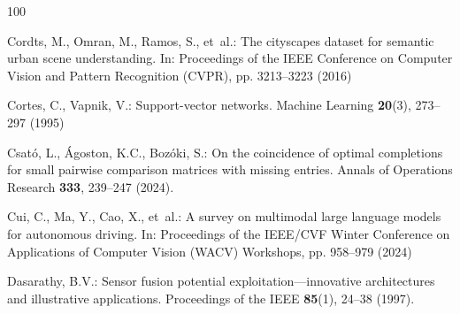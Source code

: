 \documentclass[graybox,envcountchap]{style/SNmono}
\begin{document}
\begin{thebibliography}{100}
{\color{red} 
Cordts, M., Omran, M., Ramos, S., et~al.: The cityscapes dataset for semantic
  urban scene understanding.
\newblock In: Proceedings of the IEEE Conference on Computer Vision and Pattern
  Recognition (CVPR), pp. 3213--3223 (2016)

\par}
{\color{red} 
Cortes, C., Vapnik, V.: Support-vector networks.
\newblock Machine Learning \textbf{20}(3), 273--297 (1995)

\par}

Csat{\'o}, L., {\'A}goston, K.C., Boz{\'o}ki, S.: On the coincidence of optimal
  completions for small pairwise comparison matrices with missing entries.
\newblock Annals of Operations Research \textbf{333}, 239--247 (2024).
\newblock {}


{\color{red} 
Cui, C., Ma, Y., Cao, X., et~al.: A survey on multimodal large language models
  for autonomous driving.
\newblock In: Proceedings of the IEEE/CVF Winter Conference on Applications of
  Computer Vision (WACV) Workshops, pp. 958--979 (2024)

\par}

Dasarathy, B.V.: Sensor fusion potential exploitation---innovative
  architectures and illustrative applications.
\newblock Proceedings of the IEEE \textbf{85}(1), 24--38 (1997).
\newblock {}



\end{thebibliography}
\end{document}
